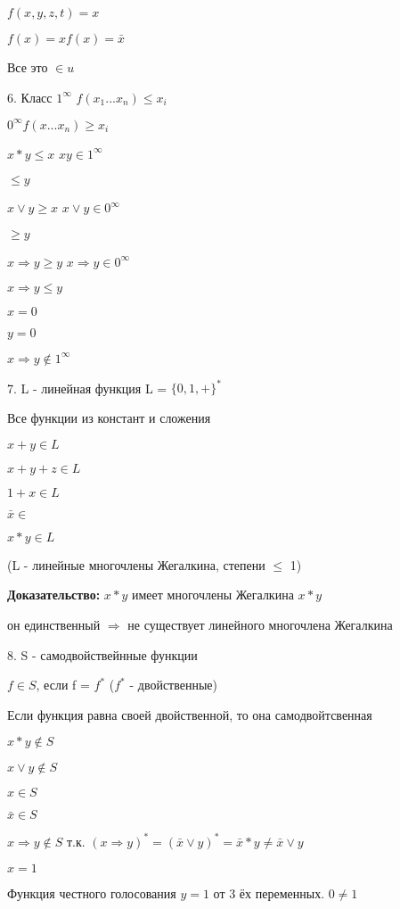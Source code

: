 \documentclass[russian]{lecture-notes}
\begin{document}
	$f(x,y,z,t) = x$

	$f(x) = x f(x) = \bar{x}$

	Все это $\in u$

	6. Класс $1^{\infty}$ $f(x_{1}...x_{n}) \leqslant x_{i} $

	\qquad $0^{\infty} f(x...x_{n}) \geqslant x_{i}$

	$x*y \leqslant x$ \qquad $xy \in 1^{\infty}$

	\quad $\leqslant y$

	$x \lor y \geqslant x$ \qquad $x \lor y \in 0^{\infty}$

	\quad $\geqslant y$

	$x \Rightarrow y \geqslant y$ \quad $x \Rightarrow y \in 0^{\infty} $

	$x \Rightarrow y \leqslant y $

	\qquad $x=0$

	\qquad $y=0$

	$x \Rightarrow y \notin 1^{\infty}$

	7. L - линейная функция L = $\{0,1,+\}^{*}$

	Все функции из констант и сложения

	$x+y \in L$

	$x+y + z \in L$

	$1+x \in L$

	$\bar{x} \in$

	$x * y \in L$

	(L - линейные многочлены Жегалкина, степени $\leqslant$ 1)

	\textbf{Доказательство: } $ x * y$ имеет многочлены Жегалкина $x*y$

	он единственный $\Rightarrow $ не существует линейного многочлена Жегалкина %

	8. S - самодвойствейнные функции

	$f \in S$, если f = $f^{*}$ \quad ($f^{*} $ - двойственные)

	Если функция равна своей двойственной, то она самодвойтсвенная

	\begin{example}
		$x*y \notin S$

		$x \lor y \notin S$

		$x \in S$

		$\bar{x} \in S$

		$x \Rightarrow y \notin S $ т.к. $(x \Rightarrow y)^{*} = (\bar{x} \lor y)^{*} = \bar{x}*y \neq \bar{x} \lor y$

		$x = 1$
		\end{example}
	Функция честного голосования $y = 1$ от 3 ёх переменных. $0 \neq 1$
\end{document}
